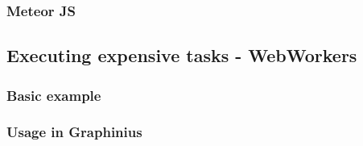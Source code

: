 		\subsubsection{Meteor JS}
		\label{sssect:meteor}


	\subsection{Executing expensive tasks - WebWorkers}
	\label{ssect:sw_webworkers}

		\subsubsection{Basic example}
		\label{sssect:basic_example}
		
		\subsubsection{Usage in Graphinius}
		\label{sssect:usage_graphinius}

